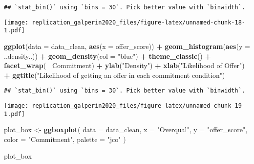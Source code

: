 \documentclass[]{article}
\newenvironment{Shaded}{\begin{snugshade}}{\end{snugshade}}
\newcommand{\DataTypeTok}[1]{\textcolor[rgb]{0.13,0.29,0.53}{#1}}
\newcommand{\KeywordTok}[1]{\textcolor[rgb]{0.13,0.29,0.53}{\textbf{#1}}}
\newcommand{\NormalTok}[1]{#1}
\newcommand{\OperatorTok}[1]{\textcolor[rgb]{0.81,0.36,0.00}{\textbf{#1}}}
\newcommand{\StringTok}[1]{\textcolor[rgb]{0.31,0.60,0.02}{#1}}
\begin{document}
\begin{verbatim}
## `stat_bin()` using `bins = 30`. Pick better value with `binwidth`.
\end{verbatim}

\texttt{[image: replication\_galperin2020\_files/figure-latex/unnamed-chunk-18-1.pdf]}

\begin{Shaded}
\begin{Highlighting}[]
\KeywordTok{ggplot}\NormalTok{(}\DataTypeTok{data =}\NormalTok{ data_clean, }\KeywordTok{aes}\NormalTok{(}\DataTypeTok{x =}\NormalTok{ offer_score)) }\OperatorTok{+}
\StringTok{  }\KeywordTok{geom_histogram}\NormalTok{(}\KeywordTok{aes}\NormalTok{(}\DataTypeTok{y =}\NormalTok{ ..density..)) }\OperatorTok{+}
\StringTok{  }\KeywordTok{geom_density}\NormalTok{(}\DataTypeTok{col =} \StringTok{"blue"}\NormalTok{) }\OperatorTok{+}
\StringTok{  }\KeywordTok{theme_classic}\NormalTok{() }\OperatorTok{+}
\StringTok{  }\KeywordTok{facet_wrap}\NormalTok{(}\OperatorTok{~}\StringTok{ }\NormalTok{Commitment) }\OperatorTok{+}
\StringTok{  }\KeywordTok{ylab}\NormalTok{(}\StringTok{"Density"}\NormalTok{) }\OperatorTok{+}
\StringTok{  }\KeywordTok{xlab}\NormalTok{(}\StringTok{"Likelihood of Offer"}\NormalTok{) }\OperatorTok{+}
\StringTok{  }\KeywordTok{ggtitle}\NormalTok{(}\StringTok{"Likelihood of getting an offer in each commitment condition"}\NormalTok{)}
\end{Highlighting}
\end{Shaded}

\begin{verbatim}
## `stat_bin()` using `bins = 30`. Pick better value with `binwidth`.
\end{verbatim}

\texttt{[image: replication\_galperin2020\_files/figure-latex/unnamed-chunk-19-1.pdf]}

\begin{Shaded}
\begin{Highlighting}[]
\NormalTok{plot_box <-}\StringTok{ }\KeywordTok{ggboxplot}\NormalTok{(}
  \DataTypeTok{data =}\NormalTok{ data_clean, }\DataTypeTok{x =} \StringTok{"Overqual"}\NormalTok{, }\DataTypeTok{y =} \StringTok{"offer_score"}\NormalTok{,}
  \DataTypeTok{color =} \StringTok{"Commitment"}\NormalTok{, }\DataTypeTok{palette =} \StringTok{"jco"}
\NormalTok{)}

\NormalTok{plot_box}
\end{Highlighting}
\end{Shaded}
\end{document}
